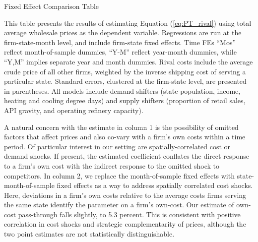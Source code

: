 \documentclass[12pt]{article}
\newcommand{\tablepath}{../output/offline/tables}
\begin{document}
\begin{table}[!htp] \doublespacing
  \begin{centering}
  \caption{Fixed Effect Comparison Table \label{tab:FECompState}}
  \par\end{centering}
  \begin{centering}
  
  \par\end{centering}
  \smallskip{}
\normalsize
This table presents the results of estimating Equation (\ref{eq:PT_rival}) using total average wholesale prices as the dependent variable. Regressions are run at the firm-state-month level, and include firm-state fixed effects. Time FEs ``Mos'' reflect month-of-sample dummies, ``Y-M'' reflect year-month dummies, while ``Y,M'' implies separate year and month dummies. Rival costs include the average crude price of all other firms, weighted by the inverse shipping cost of serving a particular state. Standard errors, clustered at the firm-state level, are presented in parentheses. All models include demand shifters (state population, income, heating and cooling degree days) and supply shifters (proportion of retail sales, API gravity, and operating refinery capacity).
\end{table}

A natural concern with the estimate in column 1 is the possibility of omitted factors that affect prices and also co-vary with a firm's own costs within a time period. Of particular interest in our setting are spatially-correlated cost or demand shocks.  If present, the estimated coefficient conflates the direct response to a firm's own cost with the indirect response to the omitted shock to competitors. In column 2, we replace the month-of-sample fixed effects with state-month-of-sample fixed effects as a way to address spatially correlated cost shocks. Here, deviations in a firm's own costs relative to the average costs firms serving the same state identify the parameter on a firm's own-cost. Our estimate of own-cost pass-through falls slightly, to 5.3 percent. This is consistent with positive correlation in cost shocks and strategic complementarity of prices, although the two point estimates are not statistically distinguishable.
\end{document}
